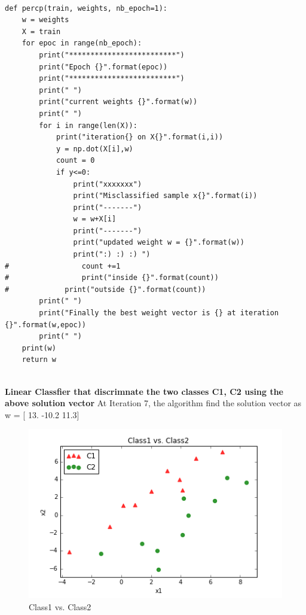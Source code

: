 \documentclass[10pt,a4paper]{article}
\begin{document}
\lstset{%
basicstyle=\small, %
identifierstyle=, %
stringstyle=\ttfamily, %
showstringspaces=false} %

\lstset{language=Python}          %

\begin{lstlisting}[label=perceptron,caption=Perceptron]  % Start your code-block

def percp(train, weights, nb_epoch=1):
    w = weights
    X = train
    for epoc in range(nb_epoch):
        print("*************************")
        print("Epoch {}".format(epoc))
        print("*************************")
        print(" ")
        print("current weights {}".format(w))
        print(" ")
        for i in range(len(X)):
            print("iteration{} on X{}".format(i,i))
            y = np.dot(X[i],w)
            count = 0
            if y<=0:
                print("xxxxxxx")
                print("Misclassified sample x{}".format(i))
                print("-------")
                w = w+X[i]
                print("-------")
                print("updated weight w = {}".format(w))
                print(":) :) :) ")
#                 count +=1
#                 print("inside {}".format(count))
#             print("outside {}".format(count))
        print(" ")           
        print("Finally the best weight vector is {} at iteration {}".format(w,epoc))
        print(" ")
    print(w)
    return w
    
\end{lstlisting}
\vfill

\textbf{Linear Classfier that discrimnate the two classes C1, C2 using the above solution vector}
At Iteration 7, the algorithm find the solution vector as w = [ 13. -10.2 11.3]

\graphicspath{ {/images/} }
\begin{figure}[h!]
\centering
\includegraphics[scale=0.5]{images/P1_C1C2.png}
  \caption{Class1 vs. Class2}
  \label{fig:p11}
\end{figure}
\end{document}
